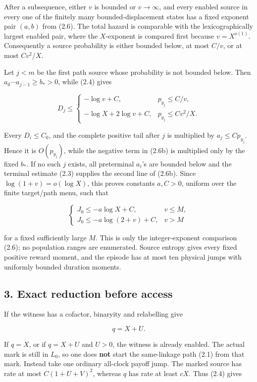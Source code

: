 After a subsequence, either \(v\) is bounded or \(v\to\infty\), and
every enabled source in every one of the finitely many
bounded-displacement states has a fixed exponent pair \((a,b)\) from
(2.6). The total hazard is comparable with the lexicographically largest
enabled pair, where the \(X\)-exponent is compared first because
\(v=X^{o(1)}\). Consequently a source probability is either bounded
below, at most \(C/v\), or at most \(Cv^2/X\).

Let \(j<m\) be the first path source whose probability is not bounded
below. Then \(a_0\cdots a_{j-1}\ge b_*>0\), while (2.4) gives

\[
 D_j\le
 \begin{cases}
  -\log v+C,&p_{y_j}\le C/v,\\
  -\log X+2\log v+C,&p_{y_j}\le Cv^2/X.
 \end{cases}                                          \tag{2.6b}
\]

Every \(D_i\le C_0\), and the complete positive tail after \(j\) is
multiplied by \(a_j\le Cp_{y_j}\). Hence it is \(O(p_{y_j})\), while the
negative term in (2.6b) is multiplied only by the fixed \(b_*\). If no
such \(j\) exists, all preterminal \(a_i\)'s are bounded below and the
terminal estimate (2.3) supplies the second line of (2.6b). Since
\(\log(1+v)=o(\log X)\), this proves constants \(a,C>0\), uniform over
the finite target/path menu, such that

\[
 \begin{cases}
 J_0\le-a\log X+C,&v\le M,\\
 J_0\le-a\log(2+v)+C,&v>M
 \end{cases}                                          \tag{2.7}
\]

for a fixed sufficiently large \(M\). This is only the integer-exponent
comparison (2.6); no population ranges are enumerated. Source entropy
gives every fixed positive reward moment, and the episode has at most
ten physical jumps with uniformly bounded duration moments.

\subsection{3. Exact reduction before
access}

If the witness has a cofactor, binaryity and relabelling give

\[
                              q=X+U.                  \tag{3.1}
\]

If \(q=X\), or if \(q=X+U\) and \(U>0\), the witness is already enabled.
The actual mark is still in \(L_0\), so one does \textbf{not} start the
same-linkage path (2.1) from that mark. Instead take one ordinary
all-clock payoff jump. The marked source has rate at most
\(C(1+U+V)^2\), whereas \(q\) has rate at least \(cX\). Thus (2.4) gives

